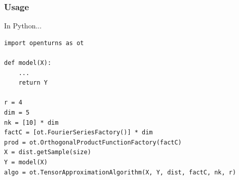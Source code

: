 \documentclass{beamer}
\begin{document}
\begin{frame}[containsverbatim]
  \frametitle{Usage}
  \begin{block}{In Python...}
\begin{lstlisting}
import openturns as ot

def model(X):
    ...
    return Y

r = 4
dim = 5
nk = [10] * dim
factC = [ot.FourierSeriesFactory()] * dim
prod = ot.OrthogonalProductFunctionFactory(factC)
X = dist.getSample(size)
Y = model(X)
algo = ot.TensorApproximationAlgorithm(X, Y, dist, factC, nk, r)
\end{lstlisting}
  \end{block}
\end{frame}

% 
% 
% 
\end{document}
